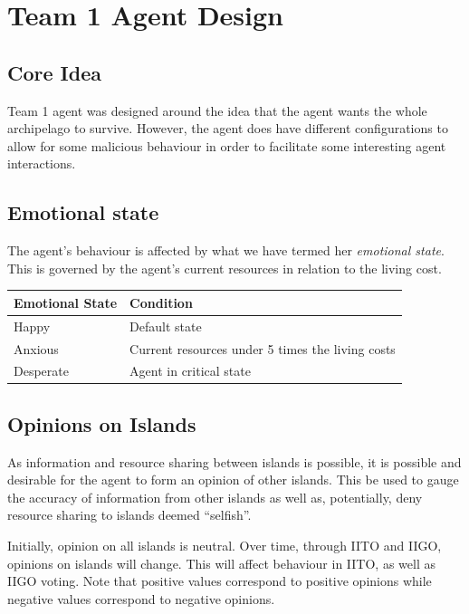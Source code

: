 \chapter{Team 1 Agent Design}

\section{Core Idea}
Team 1 agent was designed around the idea that the agent wants the whole archipelago to survive. However, the agent does have different configurations to allow for some malicious behaviour in order to facilitate some interesting agent interactions.

\section{Emotional state}

The agent's behaviour is affected by what we have termed her \emph{emotional state}. This is governed by the agent's current resources in relation to the living cost.

\begin{table} [htb]
    \centering
    \begin{tabular}{|l|l|}
        \hline
        Emotional State & Condition \\
        \hline
        Happy & Default state \\
        \hline
        Anxious & Current resources under 5 times the living costs \\
        \hline
        Desperate & Agent in critical state \\
        \hline
    \end{tabular}
\end{table}


\section{Opinions on Islands}
As information and resource sharing between islands is possible, it is possible and desirable for the agent to form an opinion of other islands. This be used to gauge the accuracy of information from other islands as well as, potentially, deny resource sharing to islands deemed ``selfish''.

Initially, opinion on all islands is neutral. Over time, through IITO and IIGO, opinions on islands will change. This will affect behaviour in IITO, as well as IIGO voting. Note that positive values correspond to positive opinions while negative values correspond to negative opinions.

